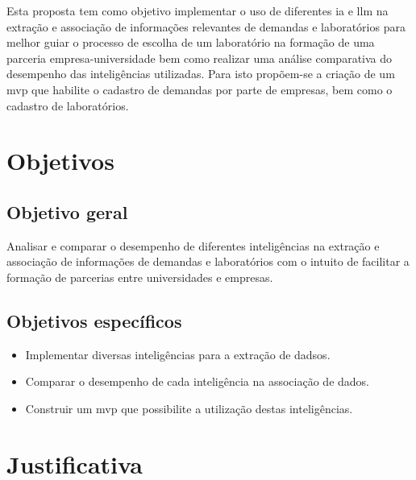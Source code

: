 Esta proposta tem como objetivo implementar o uso de diferentes \gls{ia} e \gls{llm} na extração e associação de informações relevantes de demandas e laboratórios para melhor guiar o processo de escolha de um laboratório na formação de uma parceria empresa-universidade bem como realizar uma análise comparativa do desempenho das inteligências utilizadas. Para isto propõem-se a criação de um \gls{mvp} que habilite o cadastro de demandas por parte de empresas, bem como o cadastro de laboratórios.

\section{Objetivos}\label{sec:objetivos}

\subsection{Objetivo geral}\label{subsec:objetivoGeral}

Analisar e comparar o desempenho de diferentes inteligências na extração e associação de informações de demandas e laboratórios com o intuito de facilitar a formação de parcerias entre universidades e empresas.

\subsection{Objetivos específicos}\label{subsec:objetivosEspecificos}

\begin{itemize}
    \item Implementar diversas inteligências para a extração de dadsos.
    \item Comparar o desempenho de cada inteligência na associação de dados.
    \item Construir um \gls{mvp} que possibilite a utilização destas inteligências.
\end{itemize}

\section{Justificativa}\label{sec:justificativa}


